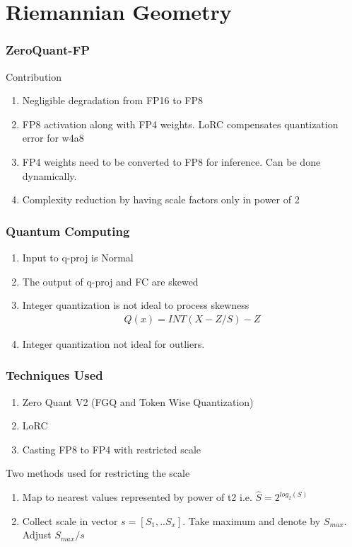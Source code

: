 \documentclass{beamer}
\theoremstyle{plain}
\theoremstyle{definition}
\theoremstyle{remark}
\numberwithin{equation}{section}
\numberwithin{figure}{section}
\numberwithin{theorem}{section}
\begin{document}
		
		\section{Riemannian Geometry}
		\begin{frame}
			\frametitle{ZeroQuant-FP}
			Contribution
			\begin{enumerate}
				\item Negligible degradation from FP16 to FP8
				\item FP8 activation along with FP4 weights. LoRC compensates quantization error for w4a8
				\item FP4 weights need to be converted to FP8 for inference. Can be done dynamically. 
				\item Complexity reduction by having scale factors only in power of 2
			\end{enumerate}
		\end{frame}
		

		
		
		\begin{frame}
			\frametitle{Quantum Computing}
			\begin{enumerate}
				\item Input to q-proj is Normal
				\item The output of q-proj and FC are skewed
				\item Integer quantization is not ideal to process skewness
				\begin{align}
					Q(x) = INT(X- Z/S) - Z
				\end{align}
				\item Integer quantization not ideal for outliers.
			\end{enumerate}
		\end{frame}
		

		\begin{frame}
			\frametitle{Techniques Used}
			\begin{enumerate}
				\item Zero Quant V2 (FGQ and Token Wise Quantization)
				\item LoRC
				\item Casting FP8 to FP4 with restricted scale
			\end{enumerate}
			Two methods used for restricting the scale
			\begin{enumerate}
				\item Map to nearest values represented by power of t2 i.e. $\hat{S} = 2^{log_2(S)}$
				\item Collect scale in vector $s= [S_1,.. S_x]$. Take maximum and denote by $S_{max}$. Adjust  $S_{max}/s$
			\end{enumerate}
		\end{frame}
		
\end{document}
